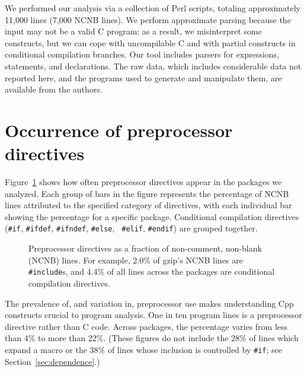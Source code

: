 \documentclass[10pt]{article}
\newcommand{\captionsmall}[1]{\caption[]{\small #1}}
\begin{document}

We performed our analysis via a collection of Perl scripts, totaling
approximately 11,000 lines (7,000 NCNB lines).  We perform approximate
parsing because the input may not be a valid C program; as a result, we
misinterpret some constructs, but we can cope with uncompilable C and with
partial constructs in conditional compilation branches.  Our tool includes
parsers for expressions, statements, and declarations.  The raw data, which
includes considerable data not reported here, and the programs used to
generate and manipulate them, are available from the authors.


\section{Occurrence of preprocessor directives}
\label{sec:directives}
\label{sec:first-content-section}

Figure~\ref{fig:directives-breakdown} shows how often preprocessor
directives appear in the packages we analyzed.  Each group of bars in the
figure represents the percentage of NCNB lines
attributed to the specified category of directives, with each individual
bar showing the percentage for a specific package.  Conditional compilation
directives ({\tt \#if}, {\tt \#ifdef}, {\tt \#ifndef}, {\tt \#else}, {\tt
\#elif}, {\tt \#endif}) are grouped together.

\begin{figure}
\centerline{}
\captionsmall{Preprocessor directives as a fraction of non-comment,
  non-blank (NCNB) lines.  For
  example, 2.0\% of gzip's NCNB lines are {\tt \#include}s, and 4.4\% of all
  lines across the packages are conditional compilation directives.}
\label{fig:directives-breakdown}
\end{figure}

The prevalence of, and variation in, preprocessor use makes understanding
Cpp constructs crucial to program analysis.  One in ten program lines is a
preprocessor directive rather than C code.  Across packages, the percentage
varies from less than 4\% to more than 22\%.  (These figures do not include
the 28\% of lines which expand a macro or the 38\% of lines whose inclusion
is controlled by {\tt \#if}; see Section~\ref{sec:dependence}.)

\end{document}
